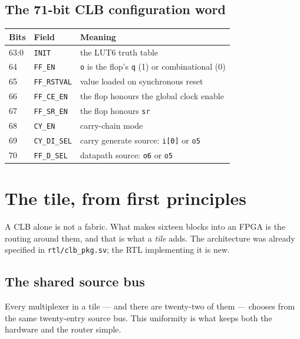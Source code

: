\documentclass[11pt,a4paper]{article}
\newcommand{\file}[1]{\texttt{#1}}
\newcommand{\sig}[1]{\texttt{#1}}
\begin{document}
\subsection{The 71-bit CLB configuration word}

\begin{center}
\begin{tabular}{lll}
\toprule
\textbf{Bits} & \textbf{Field} & \textbf{Meaning} \\
\midrule
63:0 & \texttt{INIT}       & the LUT6 truth table \\
64   & \texttt{FF\_EN}     & \sig{o} is the flop's \sig{q} (1) or combinational (0) \\
65   & \texttt{FF\_RSTVAL} & value loaded on synchronous reset \\
66   & \texttt{FF\_CE\_EN} & the flop honours the global clock enable \\
67   & \texttt{FF\_SR\_EN} & the flop honours \sig{sr} \\
68   & \texttt{CY\_EN}     & carry-chain mode \\
69   & \texttt{CY\_DI\_SEL}& carry generate source: \texttt{i[0]} or \sig{o5} \\
70   & \texttt{FF\_D\_SEL} & datapath source: \sig{o6} or \sig{o5} \\
\bottomrule
\end{tabular}
\end{center}

\section{The tile, from first principles}

A CLB alone is not a fabric. What makes sixteen blocks into an FPGA is the
routing around them, and that is what a \emph{tile} adds. The architecture was
already specified in \file{rtl/clb\_pkg.sv}; the RTL implementing it is new.

\subsection{The shared source bus}

Every multiplexer in a tile --- and there are twenty-two of them --- chooses
from the same twenty-entry source bus. This uniformity is what keeps both the
hardware and the router simple.
\end{document}
